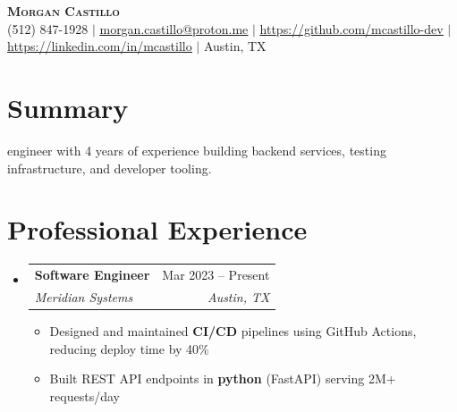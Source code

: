 \documentclass[letterpaper,11pt]{article}
\makeatletter
\newcommand{\resumeItem}[1]{\item\small{{#1 \vspace{-2pt}}}}
\newcommand{\resumeSubheading}[4]{
  \vspace{-2pt}\item
    \begin{tabular*}{0.97\textwidth}[t]{l@{\extracolsep{\fill}}r}
      \textbf{#1} & #2 \\
      \textit{\small#3} & \textit{\small #4} \\
    \end{tabular*}\vspace{-7pt}
}
\newcommand{\resumeSubHeadingListStart}{\begin{itemize}[leftmargin=0.15in, label={}]}
\newcommand{\resumeSubHeadingListEnd}{\end{itemize}}
\newcommand{\resumeItemListStart}{\begin{itemize}}
\newcommand{\resumeItemListEnd}{\end{itemize}\vspace{-5pt}}
\makeatother
\begin{document}
\begin{center}
\textbf{\Huge \scshape Morgan Castillo} \\ \vspace{1pt}
\small (512) 847-1928 $|$ \href{mailto:morgan.castillo@proton.me}{\underline{morgan.castillo@proton.me}} $|$ \href{https://github.com/mcastillo-dev}{\underline{https://github.com/mcastillo-dev}} $|$ \href{https://linkedin.com/in/mcastillo}{\underline{https://linkedin.com/in/mcastillo}} $|$ Austin, TX
\end{center}


\section{Summary}
\smallSoftware engineer with 4 years of experience building backend services, testing infrastructure, and developer tooling.





\section{Professional Experience}
\resumeSubHeadingListStart


  \resumeSubheading

    {Software Engineer}{Mar 2023 -- Present}
    {Meridian Systems}{Austin, TX}

    \resumeItemListStart


      \resumeItem{Designed and maintained \textbf{CI/CD} pipelines using GitHub Actions, reducing deploy time by 40\%}


      \resumeItem{Built REST API endpoints in \textbf{python} (FastAPI) serving 2M+ requests/day}


    \resumeItemListEnd



\resumeSubHeadingListEnd
\end{document}
